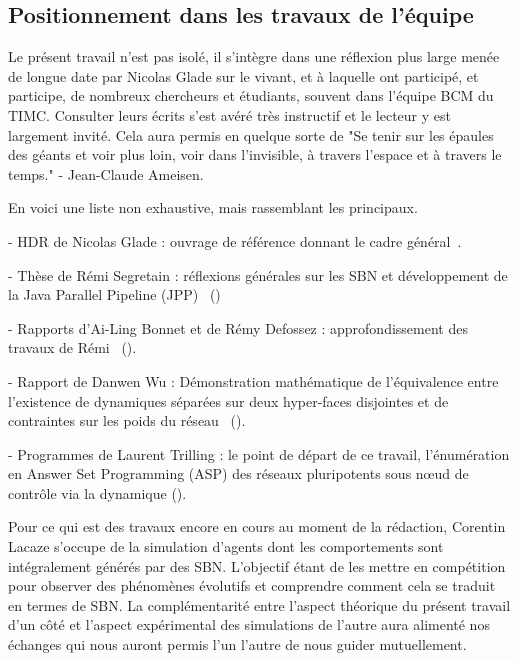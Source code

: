 \documentclass[12pt, a4paper]{article}
\begin{document}
\subsection{Positionnement dans les travaux de l'équipe}

Le présent travail n'est pas isolé, il s'intègre dans une réflexion plus large menée de longue date par Nicolas Glade sur le vivant, et à laquelle ont participé, et participe, de nombreux chercheurs et étudiants, souvent dans l'équipe BCM du TIMC. Consulter leurs écrits s'est avéré très instructif et le lecteur y est largement invité. Cela aura permis en quelque sorte de "Se tenir sur les épaules des géants et voir plus loin, voir dans l'invisible, à travers l'espace et à travers le temps." - Jean-Claude Ameisen. 

En voici une liste non exhaustive, mais rassemblant les principaux.

- HDR de Nicolas Glade : ouvrage de référence donnant le cadre général~\cite{glade2022}.

- Thèse de Rémi Segretain : réflexions générales sur les SBN et développement de la Java Parallel Pipeline (JPP)~\cite{segretain2023,segretain2020} ()

- Rapports d'Ai-Ling Bonnet et de Rémy Defossez : approfondissement des travaux de Rémi~\cite{bonnet2023,defossez2021} ().

- Rapport de Danwen Wu : Démonstration mathématique de l'équivalence entre l'existence de dynamiques séparées sur deux hyper-faces disjointes et de contraintes sur les poids du réseau~\cite{wu2024} ().

- Programmes de Laurent Trilling : le point de départ de ce travail, l'énumération en Answer Set Programming (ASP) des réseaux pluripotents sous nœud de contrôle via la dynamique ().

Pour ce qui est des travaux encore en cours au moment de la rédaction, Corentin Lacaze s'occupe de la simulation d'agents dont les comportements sont intégralement générés par des SBN. L'objectif étant de les mettre en compétition pour observer des phénomènes évolutifs et comprendre comment cela se traduit en termes de SBN. La complémentarité entre l'aspect théorique du présent travail d'un côté et l'aspect expérimental des simulations de l'autre aura alimenté nos échanges qui nous auront permis l'un l'autre de nous guider mutuellement.
\end{document}
